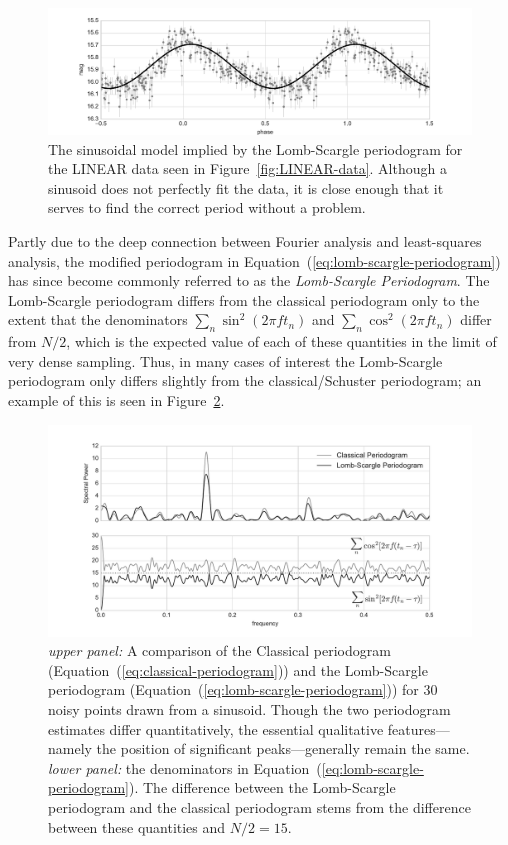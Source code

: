 \documentclass[preprint]{aastex}
\newcommand{\fig}[1]{Figure~\ref{fig:#1}}
\newcommand{\figlabel}[1]{\label{fig:#1}}
\newcommand{\Eq}[1]{Equation~(\ref{eq:#1})}
\newcommand{\eq}[1]{\Eq{#1}}
\begin{document}
\begin{figure}[ht]
  \centering
  \includegraphics[width=\textwidth]{fig18_ls_model}
  \caption{The sinusoidal model implied by the Lomb-Scargle periodogram for
    the LINEAR data seen in \fig{LINEAR-data}.
    Although a sinusoid does not perfectly fit the data, it is close enough
    that it serves to find the correct period without a problem.
    \figlabel{ls-model}}
\end{figure}

Partly due to the deep connection between Fourier analysis and least-squares
analysis, the modified periodogram in \eq{lomb-scargle-periodogram}
has since become commonly referred to as the {\it Lomb-Scargle Periodogram}.
The Lomb-Scargle periodogram differs from the classical periodogram only to
the extent that the denominators $\sum_n \sin^2(2\pi f t_n)$ and
$\sum_n \cos^2(2\pi f t_n)$ differ from $N/2$, which is the expected value of
each of these quantities in the limit of very dense sampling.
Thus, in many cases of interest the Lomb-Scargle periodogram only differs
slightly from the classical/Schuster periodogram; an example of this is seen
in \fig{ls-comparison}.

\begin{figure}[ht]
  \centering
  \includegraphics[width=\textwidth]{fig17_ls_comparison}
  \caption{{\it upper panel:} A comparison of the Classical periodogram
    (\eq{classical-periodogram}) and the Lomb-Scargle periodogram
    (\eq{lomb-scargle-periodogram}) for 30 noisy points drawn from a sinusoid.
    Though the two periodogram estimates differ quantitatively, the essential
    qualitative features---namely the position of significant peaks---generally
    remain the same.
    {\it lower panel:} the denominators in \eq{lomb-scargle-periodogram}.
    The difference between the Lomb-Scargle periodogram and the classical
    periodogram stems from the difference between these quantities
    and $N/2 = 15$.
    \figlabel{ls-comparison}}
\end{figure}
\end{document}
